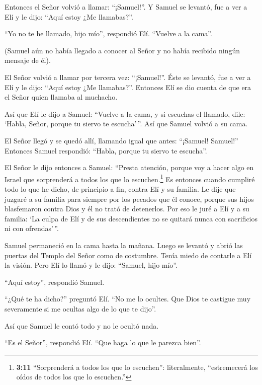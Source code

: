  Entonces el Señor volvió a llamar: ``¡Samuel!''. Y Samuel
se levantó, fue a ver a Elí y le dijo: ``Aquí estoy ¿Me llamabas?''.

``Yo no te he llamado, hijo mío'', respondió Elí. ``Vuelve a la cama''.

 (Samuel aún no había llegado a conocer al Señor y no había
recibido ningún mensaje de él).

 El Señor volvió a llamar por tercera vez: ``¡Samuel!''.
Éste se levantó, fue a ver a Elí y le dijo: ``Aquí estoy ¿Me
llamabas?''. Entonces Elí se dio cuenta de que era el Señor quien
llamaba al muchacho.

 Así que Elí le dijo a Samuel: ``Vuelve a la cama, y si
escuchas el llamado, dile: `Habla, Señor, porque tu siervo te
escucha'\,''. Así que Samuel volvió a su cama.

 El Señor llegó y se quedó allí, llamando igual que antes:
``¡Samuel! Samuel!'' Entonces Samuel respondió: ``Habla, porque tu
siervo te escucha''.

 El Señor le dijo entonces a Samuel: ``Presta atención,
porque voy a hacer algo en Israel que sorprenderá a todos los que lo
escuchen.\footnote{\textbf{3:11} ``Sorprenderá a todos los que lo
  escuchen'': literalmente, ``estremecerá los oídos de todos los que lo
  escuchen.''}  Es entonces cuando cumpliré todo lo que he
dicho, de principio a fin, contra Elí y su familia.  Le
dije que juzgaré a su familia para siempre por los pecados que él
conoce, porque sus hijos blasfemaron contra Dios y él no trató de
detenerlos.  Por eso le juré a Elí y a su familia: `La
culpa de Elí y de sus descendientes no se quitará nunca con sacrificios
ni con ofrendas'\,''.

 Samuel permaneció en la cama hasta la mañana. Luego se
levantó y abrió las puertas del Templo del Señor como de costumbre.
Tenía miedo de contarle a Elí la visión.  Pero Elí lo llamó
y le dijo: ``Samuel, hijo mío''.

``Aquí estoy'', respondió Samuel.

 ``¿Qué te ha dicho?'' preguntó Elí. ``No me lo ocultes.
Que Dios te castigue muy severamente si me ocultas algo de lo que te
dijo''.

 Así que Samuel le contó todo y no le ocultó nada.

``Es el Señor'', respondió Elí. ``Que haga lo que le parezca bien''.

